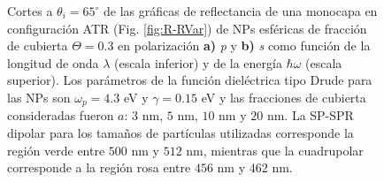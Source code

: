 \begin{figure}[h!]
	\caption{Cortes a $\theta_i = 65^\circ$ de las gráficas de reflectancia de una monocapa en configuración ATR (Fig. \ref{fig:R-RVar}) de NPs esféricas de fracción de cubierta $\Theta = 0.3$ en polarización \textbf{a)} \emph{p} y \textbf{b)} \emph{s} como función de la longitud de onda $\lambda$ (escala inferior) y de la energía $\hbar\omega$ (escala superior). Los parámetros de la función dieléctrica tipo Drude para las NPs son $\omega_p = 4.3$ eV y $\gamma = 0.15$ eV y las fracciones de cubierta consideradas fueron $a$: $3$ nm, $5$ nm, $10$ nm y $20$ nm. La SP-SPR dipolar para los tamaños de partículas utilizadas corresponde la región verde entre $500$ nm y $512$ nm, mientras que la cuadrupolar corresponde a la región rosa entre $456$ nm y $462$ nm.}\label{fig:AuAg-Cuts}
	\end{figure}	








